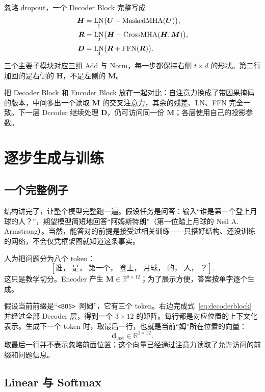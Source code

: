 \documentclass[UTF8,a4paper,12pt]{ctexart}
\numberwithin{equation}{section}
\DeclareMathOperator{\LN}{LN}
\DeclareMathOperator{\FFN}{FFN}
\newcommand{\R}{\mathbb{R}}
\newcommand{\bos}{\texttt{<BOS>}}
\begin{document}
忽略 dropout，一个 Decoder Block 完整写成
\begin{align}
\bm H&=\LN_1\bigl(\bm U+\operatorname{MaskedMHA}(\bm U)\bigr),\notag\\
\bm R&=\LN_2\bigl(\bm H+\operatorname{CrossMHA}(\bm H,\bm M)\bigr),\notag\\
\bm D&=\LN_3\bigl(\bm R+\FFN(\bm R)\bigr).
\label{eq:decoderblock}
\end{align}
三个主要子模块对应三组 Add 与 Norm，每一步都保持右侧 $t\times d$ 的形状。第二行加回的是右侧的 $\bm H$，不是左侧的 $\bm M$。

把 Decoder Block 和 Encoder Block 放在一起对比：自注意力换成了带因果掩码的版本，中间多出一个读取 $\bm M$ 的交叉注意力，其余的残差、LN、FFN 完全一致。下一层 Decoder 继续处理 $\bm D$，仍可访问同一份 $\bm M$；各层使用自己的投影参数。

\section{逐步生成与训练}
\label{sec:generation}

\subsection{一个完整例子}

结构讲完了，让整个模型完整跑一遍。假设任务是问答：输入``谁是第一个登上月球的人？''，期望模型简短地回答``阿姆斯特朗''（第一位踏上月球的 Neil A. Armstrong）。当然，能答对的前提是接受过相关训练——只搭好结构、还没训练的网络，不会仅凭框架图就知道这条事实。

人为把问题分为八个 token：
\[
[\text{谁， 是， 第一个， 登上， 月球， 的， 人， ？}].
\]
这只是教学切分。Encoder 产生 $\bm M\in\R^{8\times12}$；为了展示方便，答案按单字逐个生成。

假设当前前缀是``\bos\ 阿姆''，它有三个 token。右边完成式~\eqref{eq:decoderblock} 并经过全部 Decoder 层，得到一个 $3\times12$ 的矩阵。每行都是对应位置的上下文化表示。生成下一个 token 时，取最后一行，也就是当前``姆''所在位置的向量：
\begin{equation}
\bm d_{\mathrm{last}}\in\R^{1\times12}.
\label{eq:lastvector}
\end{equation}
取最后一行并不表示忽略前面位置；这个向量已经通过注意力读取了允许访问的前缀和问题信息。

\subsection{Linear 与 Softmax}
\end{document}
